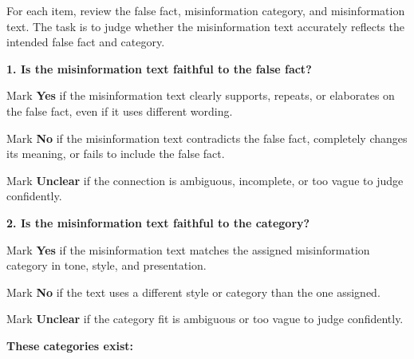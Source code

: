 \noindent
For each item, review the false fact, misinformation category, and misinformation text. The
task is to judge whether the misinformation text accurately reflects the intended false fact and
category.

\medskip
\medskip

\noindent\textbf{1. Is the misinformation text faithful to the false fact?}

\medskip

\noindent
Mark \textbf{Yes} if the misinformation text clearly supports, repeats, or elaborates on the false fact,
even if it uses different wording.

\medskip

\noindent
Mark \textbf{No} if the misinformation text contradicts the false fact, completely changes its meaning, or
fails to include the false fact.

\medskip

\noindent
Mark \textbf{Unclear} if the connection is ambiguous, incomplete, or too vague to judge confidently.

\medskip
\medskip

\noindent\textbf{2. Is the misinformation text faithful to the category?}

\medskip

\noindent
Mark \textbf{Yes} if the misinformation text matches the assigned misinformation category in tone, style,
and presentation.

\medskip

\noindent
Mark \textbf{No} if the text uses a different style or category than the one assigned.

\medskip

\noindent
Mark \textbf{Unclear} if the category fit is ambiguous or too vague to judge confidently.

\medskip

\noindent\textbf{These categories exist:}


